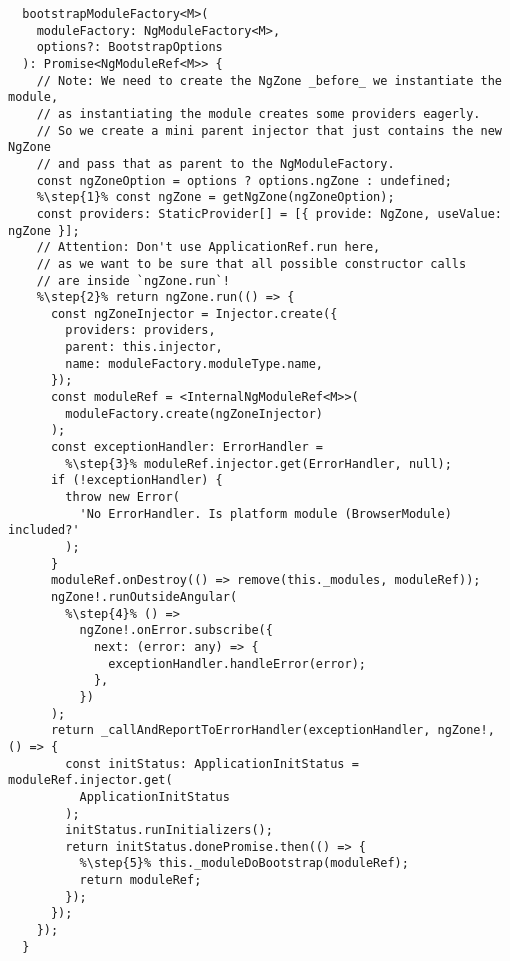 \begin{verbatim}
  bootstrapModuleFactory<M>(
    moduleFactory: NgModuleFactory<M>,
    options?: BootstrapOptions
  ): Promise<NgModuleRef<M>> {
    // Note: We need to create the NgZone _before_ we instantiate the module,
    // as instantiating the module creates some providers eagerly.
    // So we create a mini parent injector that just contains the new NgZone
    // and pass that as parent to the NgModuleFactory.
    const ngZoneOption = options ? options.ngZone : undefined;
    %\step{1}% const ngZone = getNgZone(ngZoneOption);
    const providers: StaticProvider[] = [{ provide: NgZone, useValue: ngZone }];
    // Attention: Don't use ApplicationRef.run here,
    // as we want to be sure that all possible constructor calls
    // are inside `ngZone.run`!
    %\step{2}% return ngZone.run(() => {
      const ngZoneInjector = Injector.create({
        providers: providers,
        parent: this.injector,
        name: moduleFactory.moduleType.name,
      });
      const moduleRef = <InternalNgModuleRef<M>>(
        moduleFactory.create(ngZoneInjector)
      );
      const exceptionHandler: ErrorHandler =
        %\step{3}% moduleRef.injector.get(ErrorHandler, null);
      if (!exceptionHandler) {
        throw new Error(
          'No ErrorHandler. Is platform module (BrowserModule) included?'
        );
      }
      moduleRef.onDestroy(() => remove(this._modules, moduleRef));
      ngZone!.runOutsideAngular(
        %\step{4}% () =>
          ngZone!.onError.subscribe({
            next: (error: any) => {
              exceptionHandler.handleError(error);
            },
          })
      );
      return _callAndReportToErrorHandler(exceptionHandler, ngZone!, () => {
        const initStatus: ApplicationInitStatus = moduleRef.injector.get(
          ApplicationInitStatus
        );
        initStatus.runInitializers();
        return initStatus.donePromise.then(() => {
          %\step{5}% this._moduleDoBootstrap(moduleRef);
          return moduleRef;
        });
      });
    });
  }
\end{verbatim}
